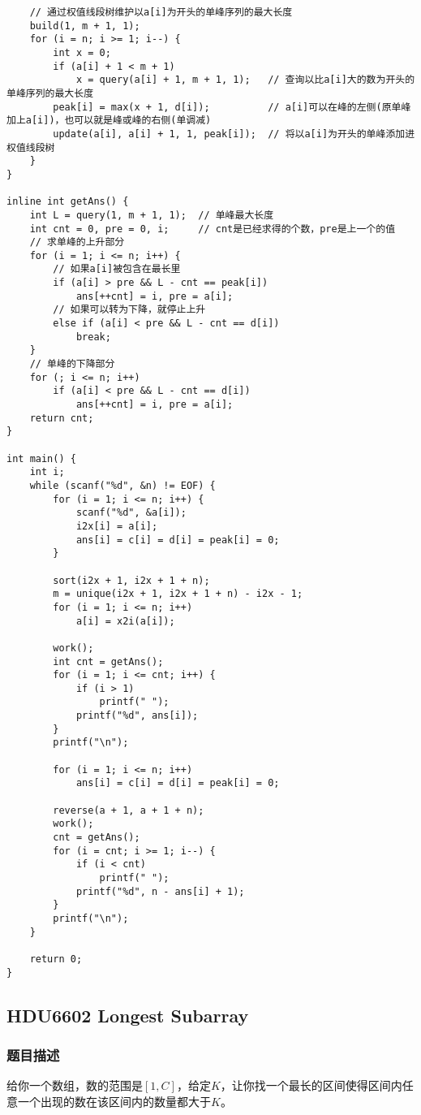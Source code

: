 \begin{lstlisting}
    // 通过权值线段树维护以a[i]为开头的单峰序列的最大长度
    build(1, m + 1, 1);
    for (i = n; i >= 1; i--) {
        int x = 0;
        if (a[i] + 1 < m + 1)
            x = query(a[i] + 1, m + 1, 1);   // 查询以比a[i]大的数为开头的单峰序列的最大长度
        peak[i] = max(x + 1, d[i]);          // a[i]可以在峰的左侧(原单峰加上a[i])，也可以就是峰或峰的右侧(单调减)
        update(a[i], a[i] + 1, 1, peak[i]);  // 将以a[i]为开头的单峰添加进权值线段树
    }
}

inline int getAns() {
    int L = query(1, m + 1, 1);  // 单峰最大长度
    int cnt = 0, pre = 0, i;     // cnt是已经求得的个数，pre是上一个的值
    // 求单峰的上升部分
    for (i = 1; i <= n; i++) {
        // 如果a[i]被包含在最长里
        if (a[i] > pre && L - cnt == peak[i])
            ans[++cnt] = i, pre = a[i];
        // 如果可以转为下降，就停止上升
        else if (a[i] < pre && L - cnt == d[i])
            break;
    }
    // 单峰的下降部分
    for (; i <= n; i++)
        if (a[i] < pre && L - cnt == d[i])
            ans[++cnt] = i, pre = a[i];
    return cnt;
}

int main() {
    int i;
    while (scanf("%d", &n) != EOF) {
        for (i = 1; i <= n; i++) {
            scanf("%d", &a[i]);
            i2x[i] = a[i];
            ans[i] = c[i] = d[i] = peak[i] = 0;
        }

        sort(i2x + 1, i2x + 1 + n);
        m = unique(i2x + 1, i2x + 1 + n) - i2x - 1;
        for (i = 1; i <= n; i++)
            a[i] = x2i(a[i]);

        work();
        int cnt = getAns();
        for (i = 1; i <= cnt; i++) {
            if (i > 1)
                printf(" ");
            printf("%d", ans[i]);
        }
        printf("\n");

        for (i = 1; i <= n; i++)
            ans[i] = c[i] = d[i] = peak[i] = 0;

        reverse(a + 1, a + 1 + n);
        work();
        cnt = getAns();
        for (i = cnt; i >= 1; i--) {
            if (i < cnt)
                printf(" ");
            printf("%d", n - ans[i] + 1);
        }
        printf("\n");
    }

    return 0;
}
\end{lstlisting}

\subsection{HDU6602 Longest Subarray}
    \subsubsection{题目描述}
        给你一个数组，数的范围是$[1,C]$，给定$K$，让你找一个最长的区间使得区间内任意一个出现的数在该区间内的数量都大于$K$。
